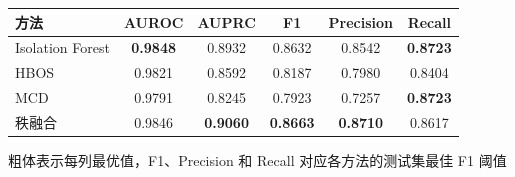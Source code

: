 \begin{minipage}{\textwidth}
  \centering
  \label{tab:task4-results}
  \begin{tabular}{lccccc}
    \toprule
    方法 & AUROC & AUPRC & F1 & Precision & Recall \\
    \midrule
    Isolation Forest & \textbf{0.9848} & 0.8932 & 0.8632 & 0.8542 & \textbf{0.8723} \\
    HBOS & 0.9821 & 0.8592 & 0.8187 & 0.7980 & 0.8404 \\
    MCD & 0.9791 & 0.8245 & 0.7923 & 0.7257 & \textbf{0.8723} \\
    秩融合 & 0.9846 & \textbf{0.9060} & \textbf{0.8663} & \textbf{0.8710} & 0.8617 \\
    \bottomrule
  \end{tabular}
  \par\smallskip
  {\small 粗体表示每列最优值，F1、Precision 和 Recall 对应各方法的测试集最佳 F1 阈值}
\end{minipage}
